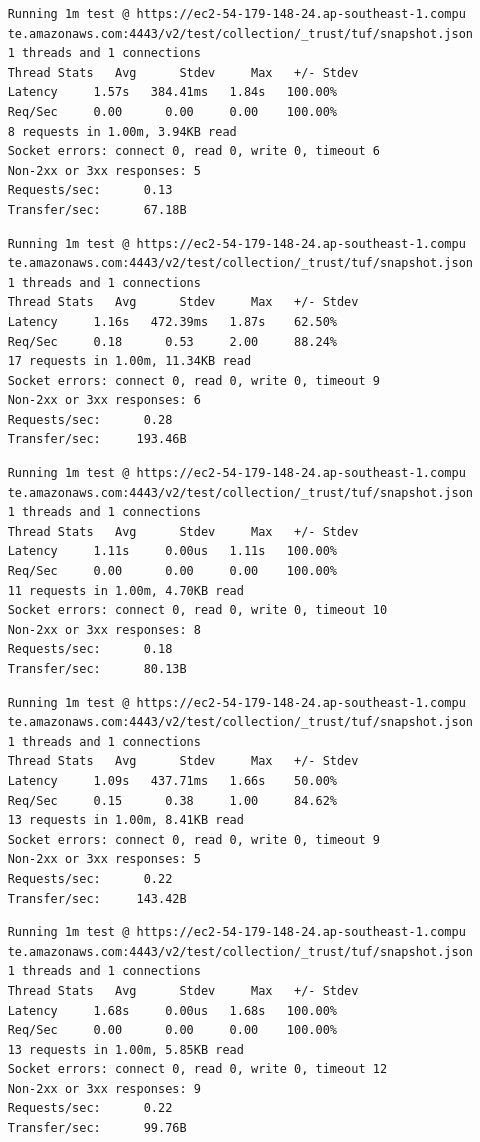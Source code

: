 \documentclass[a4paper,12pt]{article}
\newcounter{subsubsubsection}[subsubsection]
\begin{document}
{{	
	\begin{verbatim}
	Running 1m test @ https://ec2-54-179-148-24.ap-southeast-1.compu
	te.amazonaws.com:4443/v2/test/collection/_trust/tuf/snapshot.json
	1 threads and 1 connections
	Thread Stats   Avg      Stdev     Max   +/- Stdev
	Latency     1.57s   384.41ms   1.84s   100.00%
	Req/Sec     0.00      0.00     0.00    100.00%
	8 requests in 1.00m, 3.94KB read
	Socket errors: connect 0, read 0, write 0, timeout 6
	Non-2xx or 3xx responses: 5
	Requests/sec:      0.13
	Transfer/sec:      67.18B
	\end{verbatim}
	\begin{verbatim}
	Running 1m test @ https://ec2-54-179-148-24.ap-southeast-1.compu
	te.amazonaws.com:4443/v2/test/collection/_trust/tuf/snapshot.json
	1 threads and 1 connections
	Thread Stats   Avg      Stdev     Max   +/- Stdev
	Latency     1.16s   472.39ms   1.87s    62.50%
	Req/Sec     0.18      0.53     2.00     88.24%
	17 requests in 1.00m, 11.34KB read
	Socket errors: connect 0, read 0, write 0, timeout 9
	Non-2xx or 3xx responses: 6
	Requests/sec:      0.28
	Transfer/sec:     193.46B
	\end{verbatim}
	\begin{verbatim}
	Running 1m test @ https://ec2-54-179-148-24.ap-southeast-1.compu
	te.amazonaws.com:4443/v2/test/collection/_trust/tuf/snapshot.json
	1 threads and 1 connections
	Thread Stats   Avg      Stdev     Max   +/- Stdev
	Latency     1.11s     0.00us   1.11s   100.00%
	Req/Sec     0.00      0.00     0.00    100.00%
	11 requests in 1.00m, 4.70KB read
	Socket errors: connect 0, read 0, write 0, timeout 10
	Non-2xx or 3xx responses: 8
	Requests/sec:      0.18
	Transfer/sec:      80.13B
	\end{verbatim}
	\newpage
	\begin{verbatim}
	Running 1m test @ https://ec2-54-179-148-24.ap-southeast-1.compu
	te.amazonaws.com:4443/v2/test/collection/_trust/tuf/snapshot.json
	1 threads and 1 connections
	Thread Stats   Avg      Stdev     Max   +/- Stdev
	Latency     1.09s   437.71ms   1.66s    50.00%
	Req/Sec     0.15      0.38     1.00     84.62%
	13 requests in 1.00m, 8.41KB read
	Socket errors: connect 0, read 0, write 0, timeout 9
	Non-2xx or 3xx responses: 5
	Requests/sec:      0.22
	Transfer/sec:     143.42B
	\end{verbatim}
	\begin{verbatim}
	Running 1m test @ https://ec2-54-179-148-24.ap-southeast-1.compu
	te.amazonaws.com:4443/v2/test/collection/_trust/tuf/snapshot.json
	1 threads and 1 connections
	Thread Stats   Avg      Stdev     Max   +/- Stdev
	Latency     1.68s     0.00us   1.68s   100.00%
	Req/Sec     0.00      0.00     0.00    100.00%
	13 requests in 1.00m, 5.85KB read
	Socket errors: connect 0, read 0, write 0, timeout 12
	Non-2xx or 3xx responses: 9
	Requests/sec:      0.22
	Transfer/sec:      99.76B
	\end{verbatim}
	\newpage
	
}}
\end{document}
